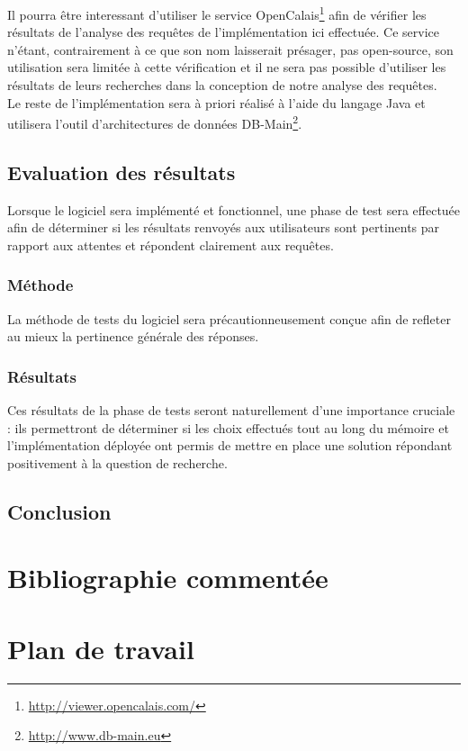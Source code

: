 \documentclass[12pt]{article}
\begin{document}
Il pourra être interessant d'utiliser le service OpenCalais\footnote{\url{http://viewer.opencalais.com/}} afin de vérifier les résultats de l'analyse des requêtes de l'implémentation ici effectuée.
Ce service n'étant, contrairement à ce que son nom laisserait présager, pas open-source, son utilisation sera limitée à cette vérification et il ne sera pas possible d'utiliser les résultats de leurs recherches dans la conception de notre analyse des requêtes. \\

Le reste de l'implémentation sera à priori réalisé à l'aide du langage Java et utilisera l'outil d'architectures de données DB-Main\footnote{\url{http://www.db-main.eu}}.
\subsection{Evaluation des résultats}
Lorsque le logiciel sera implémenté et fonctionnel, une phase de test sera effectuée afin de déterminer si les résultats renvoyés aux utilisateurs sont pertinents par rapport aux attentes et répondent clairement aux requêtes.
\subsubsection{Méthode}
La méthode de tests du logiciel sera précautionneusement conçue afin de refleter au mieux la pertinence générale des réponses. 
\subsubsection{Résultats}
Ces résultats de la phase de tests seront naturellement d'une importance cruciale : ils permettront de déterminer si les choix effectués tout au long du mémoire et l'implémentation déployée ont permis de mettre en place une solution répondant positivement à la question de recherche.
\subsection{Conclusion}

\section{Bibliographie commentée}

\section{Plan de travail}
\end{document}
